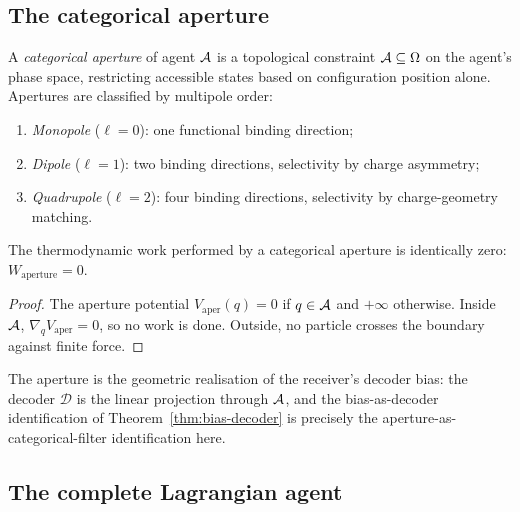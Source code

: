 \subsection{The categorical aperture}

\begin{definition}\label{def:aper}
A \emph{categorical aperture} of agent $\mathcal{A}$ is a topological constraint
$\mathcal{A}\subseteq\Omega$ on the agent's phase space, restricting accessible
states based on configuration position alone. Apertures are classified by
multipole order:
\begin{enumerate}[label=(\alph*),leftmargin=*]
\item \emph{Monopole} ($\ell=0$): one functional binding direction;
\item \emph{Dipole} ($\ell=1$): two binding directions, selectivity by
  charge asymmetry;
\item \emph{Quadrupole} ($\ell=2$): four binding directions, selectivity
  by charge-geometry matching.
\end{enumerate}
\end{definition}

\begin{theorem}\label{thm:zero-work}
The thermodynamic work performed by a categorical aperture is identically
zero: $W_{\mathrm{aperture}}=0$.
\end{theorem}

\begin{proof}
The aperture potential $V_{\mathrm{aper}}(q)=0$ if $q\in\mathcal{A}$ and $+\infty$
otherwise. Inside $\mathcal{A}$, $\nabla_q V_{\mathrm{aper}}=0$, so no work is
done. Outside, no particle crosses the boundary against finite force.
\end{proof}

The aperture is the geometric realisation of the receiver's decoder bias: the
decoder $\mathcal{D}$ is the linear projection through $\mathcal{A}$, and the
bias-as-decoder identification of Theorem~\ref{thm:bias-decoder} is
precisely the aperture-as-categorical-filter identification here.

\subsection{The complete Lagrangian agent}

